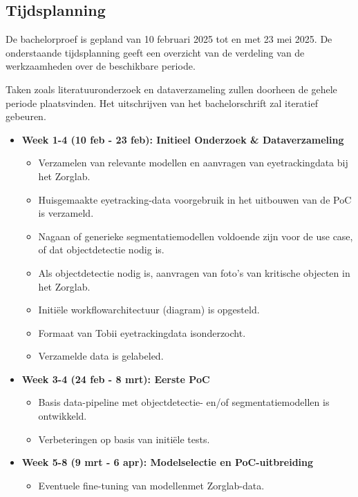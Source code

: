 \subsection{Tijdsplanning}

De bachelorproef is gepland van 10 februari 2025 tot en met 23 mei 2025. 
De onderstaande tijdsplanning geeft een overzicht van de verdeling van de werkzaamheden over de beschikbare periode.

Taken zoals literatuuronderzoek en dataverzameling zullen doorheen de gehele periode plaatsvinden.
Het uitschrijven van het bachelorschrift zal iteratief gebeuren.

\begin{itemize}
  \item \textbf{Week 1-4 (10 feb - 23 feb): Initieel Onderzoek \& Dataverzameling}
      \begin{itemize}
          \item Verzamelen van relevante modellen en aanvragen van eyetrackingdata bij het Zorglab.
          \item Huisgemaakte eyetracking-data voor\newline gebruik in het uitbouwen van de PoC is verzameld.
          \item Nagaan of generieke segmentatiemodellen voldoende zijn voor de use case, of dat objectdetectie nodig is.
          \item Als objectdetectie nodig is, aanvragen van foto's van kritische objecten in het Zorglab.
          \item Initiële workflowarchitectuur (diagram) is opgesteld.
          \item Formaat van Tobii eyetrackingdata is\newline onderzocht.
          \item Verzamelde data is gelabeled.
      \end{itemize}
  \item \textbf{Week 3-4 (24 feb - 8 mrt): Eerste PoC}
      \begin{itemize}
          \item Basis data-pipeline met objectdetectie- en/of segmentatiemodellen is ontwikkeld.
          \item Verbeteringen op basis van initiële tests.
      \end{itemize}
  \item \textbf{Week 5-8 (9 mrt - 6 apr): Modelselectie en PoC-uitbreiding}
      \begin{itemize}
          \item Eventuele fine-tuning van modellen\newline met Zorglab-data.

\end{itemize}
\end{itemize}
